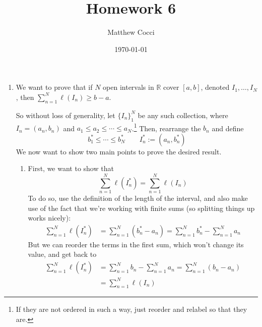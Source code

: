 \documentclass[12pt]{article}
\author{Matthew Cocci}
\title{\textbf{Homework 6}}
\date{\today}
\theoremstyle{plain}
\theoremstyle{definition}
\theoremstyle{remark}
\begin{document}
\maketitle 

\begin{enumerate} 

\item We want to prove that if $N$ open intervals in $\mathbb{R}$ cover $[a,b]$, denoted $I_1, \ldots,I_N$, then $\sum^N_{n=1} \ell(I_n)\geq b-a$.

So without loss of generality, let $\{I_n\}_1^N$ be any such collection, where $I_n=(a_n, b_n)$ and $a_1\leq a_2\leq\cdots\leq a_N$.\footnote{If they are not ordered in such a way, just reorder and relabel so that they are.} Then, rearrange the $b_n$ and define 
\[
    b_1^* \leq \cdots \leq b_N^* \qquad
    I_n^* := (a_n, b^*_n)
\]
We now want to show two main points to prove the desired result.
\begin{enumerate}

\item First, we want to show that
\begin{equation}
    \label{q1.eq}
    \sum^N_{n=1} \ell(I_n^*) = \sum^N_{n=1} \ell(I_n) 
\end{equation}
To do so, use the definition of the length of the interval, and also make use of the fact that we're working with finite sums (so splitting things up works nicely):
\begin{align*}
    \sum^N_{n=1} \ell(I_n^*) &= \sum^N_{n=1} (b_n^* - a_n )
    = \sum^N_{n=1} b_n^* -  \sum^N_{n=1}a_n 
\end{align*}
But we can reorder the terms in the first sum, which won't change its value, and get back to 
\begin{align*}
    \sum^N_{n=1} \ell(I_n^*) &= 
        \sum^N_{n=1} b_n -  \sum^N_{n=1}a_n 
    = \sum^N_{n=1} (b_n -  a_n) \\
    &= \sum^N_{n=1} \ell(I_n) 
\end{align*}


\end{enumerate}
\end{enumerate}
\end{document}

